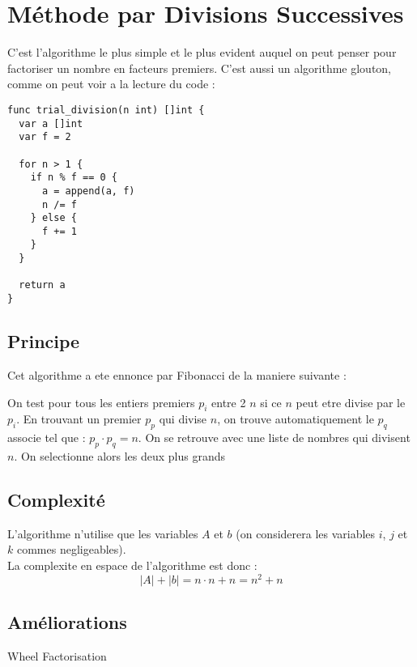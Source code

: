 \section{Méthode par Divisions Successives}

    C'est l'algorithme le plus simple et le plus evident auquel on peut penser pour factoriser un nombre en facteurs premiers. C'est aussi un algorithme glouton, comme on peut voir a la lecture du code :
    
    \begin{lstlisting}
func trial_division(n int) []int {
  var a []int
  var f = 2

  for n > 1 {
    if n % f == 0 {
      a = append(a, f)
      n /= f
    } else {
      f += 1
    }
  }

  return a
}
    \end{lstlisting}
    
    \subsection{Principe}
    Cet algorithme a ete ennonce par Fibonacci de la maniere suivante :
    
    On test pour tous les entiers premiers $p_i$ entre 2 $n$ si ce $n$ peut etre divise par le $p_i$. En trouvant un premier $p_p$ qui divise $n$, on trouve automatiquement le $p_q$ associe tel que : $p_p \cdot p_q = n$.
    On se retrouve avec une liste de nombres qui divisent $n$. On selectionne alors les deux plus grands 
    
    \subsection{Complexité}
    
    L'algorithme n'utilise que les variables $A$ et $b$ (on considerera les variables $i$, $j$ et $k$ commes negligeables).\\
    La complexite en espace de l'algorithme est donc : $$\lvert A \rvert + \lvert b \rvert = n \cdot n + n = n ^2 +n$$
    
    \subsection{Améliorations}
    
    Wheel Factorisation